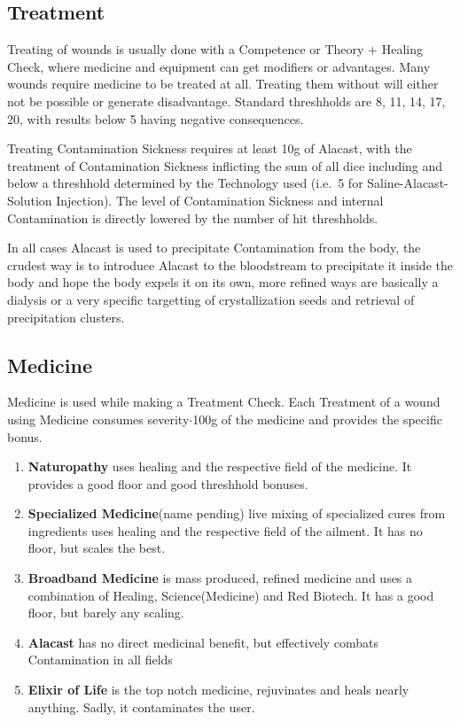 \subsection{Treatment}\label{subsec:treatment}
Treating of wounds is usually done with a Competence or Theory + Healing Check, where medicine and equipment can get modifiers or advantages.
Many wounds require medicine to be treated at all.
Treating them without will either not be possible or generate disadvantage.
Standard threshholds are 8, 11, 14, 17, 20, with results below 5 having negative consequences.

Treating Contamination Sickness requires at least 10g of Alacast, with the treatment of
Contamination Sickness inflicting the sum of all dice including and below a threshhold determined by the
Technology used (i.e.\ 5 for Saline-Alacast-Solution Injection).
The level of Contamination Sickness and internal Contamination is directly lowered by the number of hit threshholds.

In all cases Alacast is used to precipitate Contamination from the body, the
crudest way is to introduce Alacast to the bloodstream to precipitate it inside the body and hope the body expels
it on its own, more refined ways are basically a dialysis or a very specific targetting of crystallization seeds
and retrieval of precipitation clusters.

\subsection{Medicine}\label{subsec:medicine}
Medicine is used while making a Treatment Check.
Each Treatment of a wound using Medicine consumes
severity\(\cdot\)100g of the medicine and provides the specific bonus.

\begin{enumerate}[label= -]
    \item \textbf{Naturopathy} uses healing and the respective field of the medicine.
    It provides a good floor and good threshhold bonuses.
    \item \textbf{Specialized Medicine}(name pending) live mixing of specialized cures from ingredients
    uses healing and the respective field of the ailment.
    It has no floor, but scales the best.
    \item \textbf{Broadband Medicine} is mass produced, refined medicine and uses a combination of
    Healing, Science(Medicine) and Red Biotech.
    It has a good floor, but barely any scaling.
    \item \textbf{Alacast} has no direct medicinal benefit, but effectively combats Contamination in all fields
    \item \textbf{Elixir of Life} is the top notch medicine, rejuvinates and heals nearly anything.
    Sadly, it contaminates the user.
\end{enumerate}

